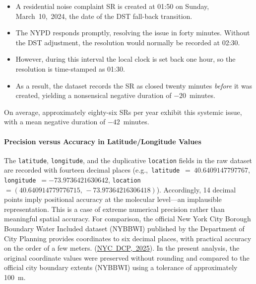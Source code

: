 \documentclass[linenumber]{jdsart}
\begin{document}
\begin{itemize}[left=1.5em]
  \item A residential noise complaint SR is created at 01{:}50 on Sunday, March~10,~2024, 
  the date of the DST fall-back transition. 

  \item The \textsc{NYPD} responds promptly, resolving the issue in 
  forty minutes. 
  Without the DST adjustment, the resolution would normally be recorded 
  at 02{:}30.  

  \item However, during this interval the local clock is set back one hour, 
  so the resolution is time-stamped as 01{:}30.  

  \item As a result, the dataset records the SR as closed 
  twenty minutes \emph{before} it was created, yielding a nonsensical
  negative duration of $-20$~minutes.  
\end{itemize}

On average, approximately eighty-six SRs per year exhibit this systemic issue, 
with a mean negative duration of $-42$~minutes.

\paragraph{Precision versus Accuracy in Latitude/Longitude Values}
\label{par:precision}
The \texttt{latitude}, \texttt{longitude}, and the duplicative 
\texttt{location} fields in the raw dataset are recorded with 
fourteen decimal places 
(e.g.,~\texttt{latitude}~$=~40.6409147797767$, 
\texttt{longitude}~$=-73.9736421630642$, 
\texttt{location}~$=(40.640914779776715,\,-73.97364216306418)$). 
Accordingly, 14 decimal points imply positional accuracy at 
the molecular level—an implausible representation. 
This is a case of extreme numerical precision rather than meaningful spatial 
accuracy. For comparison, the official New York City Borough Boundary Water Included
dataset (\textsc{NYBBWI}) published by the Department of City Planning provides 
coordinates to six decimal places, with practical accuracy on the order 
of a few meters. 
(\href{https://s-media.nyc.gov/agencies/dcp/assets/files/pdf/data-tools/bytes/nybbwi_metadata.pdf}{NYC~DCP,~2025}). 
In the present analysis, the original coordinate values were preserved 
without rounding and compared to the official city boundary extents 
(\textsc{NYBBWI}) using a tolerance of approximately \SI{100}{\meter}.


\end{document}
